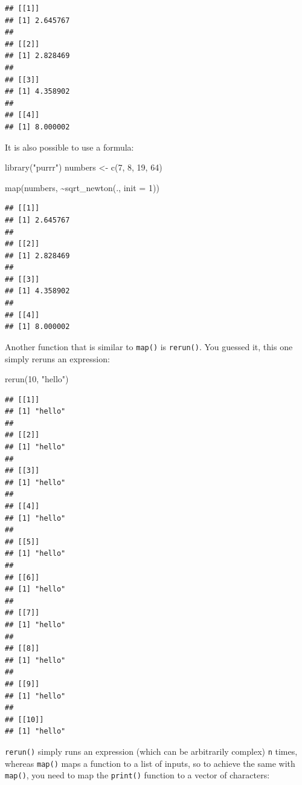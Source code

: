 \documentclass[
]{article}
\newenvironment{Shaded}{\begin{snugshade}}{\end{snugshade}}
\newcommand{\AttributeTok}[1]{\textcolor[rgb]{0.77,0.63,0.00}{#1}}
\newcommand{\DecValTok}[1]{\textcolor[rgb]{0.00,0.00,0.81}{#1}}
\newcommand{\FunctionTok}[1]{\textcolor[rgb]{0.00,0.00,0.00}{#1}}
\newcommand{\NormalTok}[1]{#1}
\newcommand{\OtherTok}[1]{\textcolor[rgb]{0.56,0.35,0.01}{#1}}
\newcommand{\SpecialCharTok}[1]{\textcolor[rgb]{0.00,0.00,0.00}{#1}}
\newcommand{\StringTok}[1]{\textcolor[rgb]{0.31,0.60,0.02}{#1}}
\begin{document}
\begin{verbatim}
## [[1]]
## [1] 2.645767
## 
## [[2]]
## [1] 2.828469
## 
## [[3]]
## [1] 4.358902
## 
## [[4]]
## [1] 8.000002
\end{verbatim}

It is also possible to use a formula:

\begin{Shaded}
\begin{Highlighting}[]
\FunctionTok{library}\NormalTok{(}\StringTok{"purrr"}\NormalTok{)}
\NormalTok{numbers }\OtherTok{\textless{}{-}} \FunctionTok{c}\NormalTok{(}\DecValTok{7}\NormalTok{, }\DecValTok{8}\NormalTok{, }\DecValTok{19}\NormalTok{, }\DecValTok{64}\NormalTok{)}

\FunctionTok{map}\NormalTok{(numbers, }\SpecialCharTok{\textasciitilde{}}\FunctionTok{sqrt\_newton}\NormalTok{(., }\AttributeTok{init =} \DecValTok{1}\NormalTok{))}
\end{Highlighting}
\end{Shaded}

\begin{verbatim}
## [[1]]
## [1] 2.645767
## 
## [[2]]
## [1] 2.828469
## 
## [[3]]
## [1] 4.358902
## 
## [[4]]
## [1] 8.000002
\end{verbatim}

Another function that is similar to \texttt{map()} is \texttt{rerun()}. You guessed it, this one simply
reruns an expression:

\begin{Shaded}
\begin{Highlighting}[]
\FunctionTok{rerun}\NormalTok{(}\DecValTok{10}\NormalTok{, }\StringTok{"hello"}\NormalTok{)}
\end{Highlighting}
\end{Shaded}

\begin{verbatim}
## [[1]]
## [1] "hello"
## 
## [[2]]
## [1] "hello"
## 
## [[3]]
## [1] "hello"
## 
## [[4]]
## [1] "hello"
## 
## [[5]]
## [1] "hello"
## 
## [[6]]
## [1] "hello"
## 
## [[7]]
## [1] "hello"
## 
## [[8]]
## [1] "hello"
## 
## [[9]]
## [1] "hello"
## 
## [[10]]
## [1] "hello"
\end{verbatim}

\texttt{rerun()} simply runs an expression (which can be arbitrarily complex) \texttt{n} times, whereas \texttt{map()}
maps a function to a list of inputs, so to achieve the same with \texttt{map()}, you need to map the \texttt{print()}
function to a vector of characters:
\end{document}
